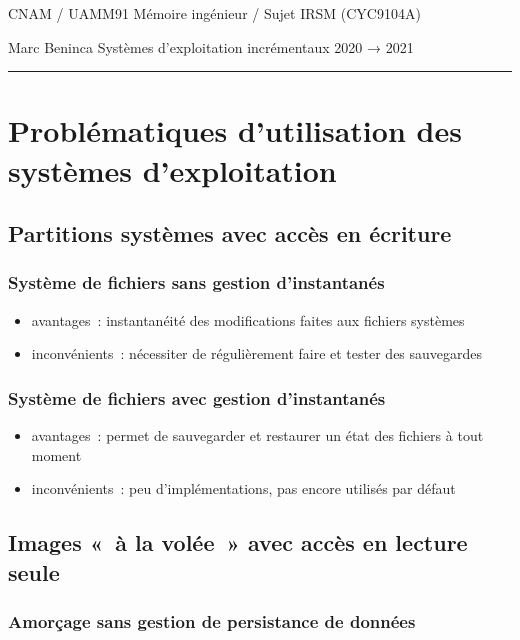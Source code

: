 \documentclass[10pt]{article}
\newcommand{\hr}{\rule{\textwidth}{1pt}}
\newenvironment{itmz}{\begin{itemize}
\setlength{\itemsep}{0em}
}{\end{itemize}}
\begin{document}
CNAM / UAMM91 \hfill Mémoire ingénieur / Sujet \hfill IRSM (CYC9104A)

Marc Beninca \hfill Systèmes d’exploitation incrémentaux \hfill 2020 → 2021

\hr

\section{Problématiques d’utilisation des systèmes d’exploitation}

\subsection{Partitions systèmes avec accès en écriture}

\subsubsection{Système de fichiers sans gestion d’instantanés}

\begin{itmz}
\item{avantages : instantanéité des modifications faites aux fichiers systèmes}
\item{inconvénients : nécessiter de régulièrement faire et tester des sauvegardes}
\end{itmz}

\subsubsection{Système de fichiers avec gestion d’instantanés}

\begin{itmz}
\item{avantages : permet de sauvegarder et restaurer un état des fichiers à tout moment}
\item{inconvénients : peu d’implémentations, pas encore utilisés par défaut}
\end{itmz}

\subsection{Images « à la volée » avec accès en lecture seule}

\subsubsection{Amorçage sans gestion de persistance de données}
\end{document}
